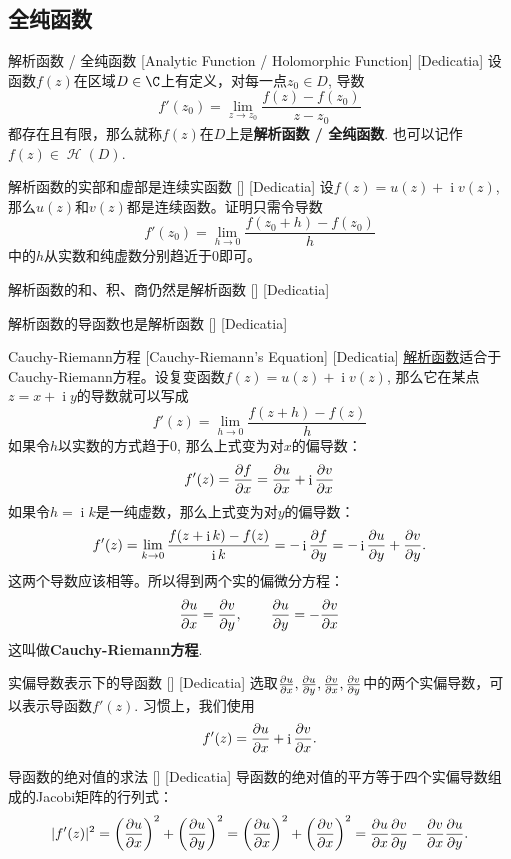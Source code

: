 \documentclass[UTF8]{ctexart}
\DeclareMathOperator{\ii}{\mathrm{i}}
\DeclareMathOperator{\HF}{\mathcal{H}}
\newcommand{\AnalyticalFunction}{\hyperref[dfn:AnalyticalFunction]{解析函数}}
\begin{document}
\subsection{全纯函数}
\begin{dfn}
    [UUID]
    {解析函数\label{dfn:AnalyticalFunction} / 全纯函数}
    [Analytic Function / Holomorphic Function]
    [Dedicatia]
    设函数$f(z)$在区域$D\in\C$上有定义，对每一点$z_0\in D$, 导数
    \[f'(z_0)=\lim_{z\to z_0}\frac{f(z)-f(z_0)}{z-z_0}\]
    都存在且有限，那么就称$f(z)$在$D$上是\textbf{解析函数 / 全纯函数}. 也可以记作$f(z)\in\HF(D)$.
\end{dfn}
\begin{ppt}
    [UUID]
    {解析函数的实部和虚部是连续实函数}
    []
    [Dedicatia]
    设$f(z)=u(z)+\ii v(z)$, 那么$u(z)$和$v(z)$都是连续函数。证明只需令导数
    \[f'(z_0)=\lim_{h\to 0}\frac{f(z_0+h)-f(z_0)}{h}\]
    中的$h$从实数和纯虚数分别趋近于0即可。
\end{ppt}
\begin{ppt}
    [UUID]
    {解析函数的和、积、商仍然是解析函数}
    []
    [Dedicatia]
\end{ppt}
\begin{ppt}
    [UUID]
    {解析函数的导函数也是解析函数}
    []
    [Dedicatia]
\end{ppt}
\begin{thm}
    [UUID]
    {Cauchy-Riemann方程}
    [Cauchy-Riemann's Equation]
    [Dedicatia]
    \AnalyticalFunction 适合于Cauchy-Riemann方程。设复变函数$f(z)=u(z)+\ii v(z)$, 那么它在某点$z=x+\ii y$的导数就可以写成
    \[f'(z)=\lim_{h\to 0}\frac{f(z+h)-f(z)}{h}\]
    如果令$h$以实数的方式趋于0, 那么上式变为对$x$的偏导数：
    \[f'(z)=\pdv{f}{x}=\pdv{u}{x}+\ii\pdv{v}{x}\]
    如果令$h=\ii k$是一纯虚数，那么上式变为对$y$的偏导数：
    \[f'(z)=\lim_{k\to 0}\frac{f(z+\ii k)-f(z)}{\ii k}=-\ii\pdv{f}{y}=-\ii\pdv{u}{y}+\pdv{v}{y}.\]
    这两个导数应该相等。所以得到两个实的偏微分方程：
    \[\pdv{u}{x}=\pdv{v}{y},\qquad\pdv{u}{y}=-\pdv{v}{x}\]
    这叫做\textbf{Cauchy-Riemann方程}.
\end{thm}
\begin{crl}
    [UUID]
    {实偏导数表示下的导函数}
    []
    [Dedicatia]
    选取$\pdv{u}{x}, \pdv{u}{y}, \pdv{v}{x}, \pdv{v}{y}$中的两个实偏导数，可以表示导函数$f'(z)$. 习惯上，我们使用
    \[f'(z)=\pdv{u}{x}+\ii\pdv{v}{x}.\]
\end{crl}
\begin{crl}
    [UUID]
    {导函数的绝对值的求法}
    []
    [Dedicatia]
    导函数的绝对值的平方等于四个实偏导数组成的Jacobi矩阵的行列式：
    \[|f'(z)|^2=\qty(\pdv{u}{x})^2+\qty(\pdv{u}{y})^2=\qty(\pdv{u}{x})^2+\qty(\pdv{v}{x})^2=\pdv{u}{x}\pdv{v}{y}-\pdv{v}{x}\pdv{u}{y}.\]
\end{crl}
\end{document}
